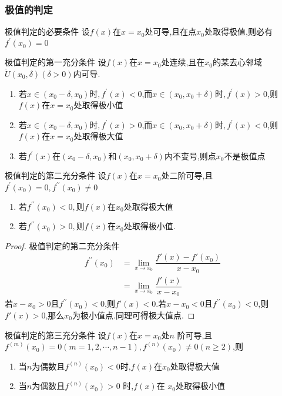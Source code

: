 \documentclass[8pt a4paper, oneside, UTF8]{ctexbook}  %
\begin{document}
\begin{sloppypar}
    \subsubsection{极值的判定}
    \begin{defn}{极值判定的必要条件}{}
        设$f(x)$在$x=x_0$处可导,且在点$x_0$处取得极值,则必有$f^{\prime}(x_0)=0$
    \end{defn}
    \begin{defn}{极值判定的第一充分条件}{}
            设$f(x)$在$x=x_0$处连续,且在$x_0$的某去心邻域$\mathring U(x_0,\delta)(\delta>0)$内可导.
            \begin{enumerate}
                \item 若$x\in(x_0-\delta,x_0)$时$,f^\prime(x)<0$,而$x\in(x_0,x_0+\delta)$时$,f^\prime(x)>0$,则$f(x)$在$x=x_0$处取得极小值
                \item 若$x\in(x_0-\delta,x_0)$时$,f^\prime(x)>0$,而$x\in(x_0,x_0+\delta)$时$,f^\prime(x)<0$,则$f(x)$在$x=x_0$处取得极大值
                \item 若$f^\prime(x)$在$(x_0-\delta,x_0)$和$(x_0,x_0+\delta)$内不变号,则点$x_0$不是极值点
            \end{enumerate}
    \end{defn}
    \begin{defn}{极值判定的第二充分条件}{}
        设$f(x)$在$x=x_0$处二阶可导,且$f^\prime(x_{0})=0,f^{\prime\prime}(x_{0})\neq0$ 
        \begin{enumerate}
            \item 若$f^{\prime\prime}(x_{0})<0,则f(x)$在$x_0$处取得极大值
            \item 若$f^{\prime\prime}(x_{0})>0,则f(x)$在$x_{0}$处取得极小值.
        \end{enumerate}
        \begin{proof}{极值判定的第二充分条件}
            \begin{align*}
              f^{\prime\prime} (x_0)& =  \lim_{x\to x_0} \dfrac{f'(x)-f'(x_0)}{x-x_0} \\
              & =   \lim_{x\to x_0} \dfrac{f'(x)}{x-x_0} 
            \end{align*}
            若$x-x_0>0$且$f^{\prime\prime} (x_0)<0$,则$f'(x)<0$.若$x-x_0<0$且$f^{\prime\prime} (x_0)<0$,则$f'(x)>0$,那么$x_0$为极小值点.同理可得极大值点.
        \end{proof}
    \end{defn}
    \begin{defn}{极值判定的第三充分条件}{}
        设$f(x)$在$x=x_0$处$n$ 阶可导,且$f^{(m)}(x_0)=0(m=1,2,\cdots,n-1),f^{(n)}(x_0)\neq0(n\geqslant2)$,则
        \begin{enumerate}
            \item 当$n$为偶数且$f^{(n)}(x_0)<0$时,$f(x)$在$x_0$处取得极大值
            \item 当$n$为偶数且$f^{(n)}(x_0)>0$ 时,$f(x)$在 $x_0$处取得极小值
        \end{enumerate}
    \end{defn}

\end{sloppypar}
\end{document}
